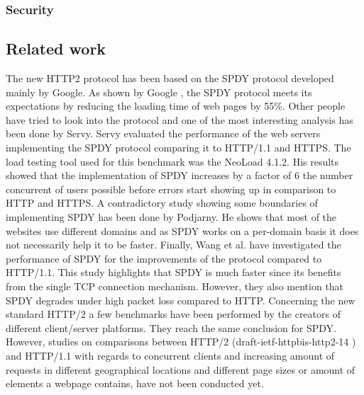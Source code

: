 \subsubsection{Security}

\subsection{Related work}
The new HTTP2 protocol has been based on the SPDY protocol developed mainly by Google. As shown by Google \cite{google2x}, the SPDY protocol meets its expectations by reducing the loading time of web pages by 55\%. Other people have tried to look into the protocol and one of the most interesting analysis has been done by Servy\cite{servy}. Servy evaluated the performance of the web servers implementing the SPDY protocol comparing it to HTTP/1.1 and HTTPS. The load testing tool used for this benchmark was the NeoLoad 4.1.2. His results showed that the implementation of SPDY increases by a factor of 6 the number concurrent of users possible before errors start showing up in comparison to HTTP and HTTPS. 
A contradictory study showing some boundaries of implementing SPDY has been done by Podjarny\cite{podiatry}. He shows that most of the websites use different domains and as SPDY works on a per-domain basis it does not necessarily help it to be faster. Finally, Wang et al.\cite{wang} have investigated the performance of SPDY for the improvements of the protocol compared to HTTP/1.1. This study highlights that SPDY is much faster since its benefits from the single TCP connection mechanism. However, they also mention that SPDY degrades under high packet loss compared to HTTP. 
Concerning the new standard HTTP/2 a few benchmarks have been performed by the creators of different client/server platforms. They reach the same conclusion for SPDY. \\
However, studies on comparisons between HTTP/2 (draft-ietf-httpbis-http2-14 \cite{h2c-14} ) and HTTP/1.1 with regards to concurrent clients and increasing amount of requests in different geographical locations and different page sizes or amount of elements a webpage contains, have not been conducted yet.